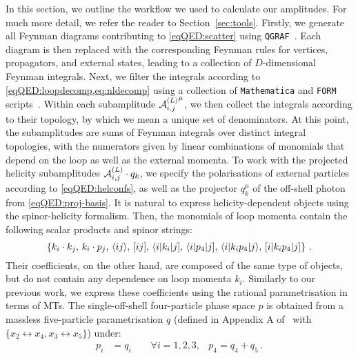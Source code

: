 \documentclass[main.tex]{subfiles}
\begin{document}
In this section, we outline the workflow we used to calculate our amplitudes. For much more detail, we refer the reader to Section~\ref{sec:tools}. Firstly, we generate all Feynman diagrams contributing to \cref{eqQED:scatter} using \texttt{QGRAF}~\cite{Nogueira:1991ex}. Each diagram is then replaced with the corresponding Feynman rules for vertices, propagators, and external states, leading to a collection of $D$-dimensional Feynman integrals. Next, we filter the integrals according to \cref{eqQED:loopdecomp,eq:nldecomp} using a collection of \texttt{Mathematica} and \texttt{FORM} scripts~\cite{Kuipers:2012rf,
Ruijl:2017dtg}. Within each subamplitude ${\mathcal{A}^{(L)}_{i, j}}^{\mu}$, we then collect the integrals according to their topology, by which we mean a unique set of denominators. 
At this point, the subamplitudes are sums of Feynman integrals over distinct integral topologies, with the numerators given by linear combinations of monomials that depend on the loop as well as the external momenta. To work with the projected helicity subamplitudes $\mathcal{A}^{(L)}_{i,j}\cdot q_k$, we specify the polarisations of external particles according to \cref{eqQED:helconfs}, as well as the projector $q_k^\mu$ of the off-shell photon from \cref{eqQED:proj-basis}. It is natural to express helicity-dependent objects using the spinor-helicity formalism. Then, the monomials of loop momenta contain the following scalar products and spinor strings:
\begin{equation} \label{eqQED:loopmomobjects}
	\left\{ k_i \cdot k_j, \,
    k_i \cdot p_j ,\,
    \langle ij \rangle,\,
    [ ij ],\,
    \langle i |k_i |j],\,
    \langle i |p_4 |j],\,
    \langle i|k_i p_4|j \rangle,\,
    [i| k_i p_4 |j] \right\} \,.
\end{equation}
Their coefficients, on the other hand, are composed of the same type of
objects, but do not contain any dependence on loop momenta $k_i$.  Similarly to our previous work, we express these coefficients using the rational parametrisation in terms of MTs. The single-off-shell four-particle phase space $p$ is obtained from a massless five-particle parametrisation $q$ (defined in Appendix A of~ with $\{x_2\leftrightarrow x_4,x_3\leftrightarrow x_5\}$) under:
\begin{align}
    p_i &= q_i \qquad \forall i=1,2,3, & p_4=q_4+q_5 \, .
\end{align}
\end{document}
